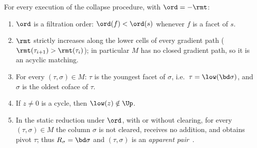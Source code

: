 \begin{lemma}\label{lem:apparent}
For every execution of the collapse procedure, with $\ord=-\rmt$:
\begin{enumerate}
\item[(a)] $\ord$ is a filtration order: $\ord(f)<\ord(s)$ whenever $f$ is a facet
  of $s$.
\item[(b)] $\rmt$ strictly increases along the lower cells of every gradient
  path ($\rmt(\tau_{i+1})>\rmt(\tau_i)$); in particular $M$ has no closed
  gradient path, so it is an acyclic matching.
\item[(c)] For every $(\tau,\sigma)\in M$: $\tau$ is the youngest facet of
  $\sigma$, i.e.\ $\tau=\low(\bd\sigma)$, and $\sigma$ is the oldest coface of
  $\tau$.
\item[(d)] If $z\ne0$ is a cycle, then $\low(z)\notin\Up$.
\item[(e)] In the static reduction under $\ord$, with or without clearing, for
  every $(\tau,\sigma)\in M$ the column $\sigma$ is not cleared, receives no
  addition, and obtains pivot $\tau$; thus $R_\sigma=\bd\sigma$ and
  $(\tau,\sigma)$ is an \emph{apparent pair}~\cite{bauer2021ripser}.
\end{enumerate}
\end{lemma}

